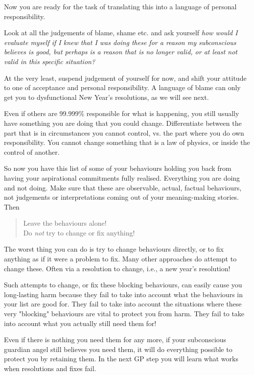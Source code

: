 Now you are ready for the task of translating this into a language of personal responsibility. 


Look at all the judgements of blame, shame etc. and ask yourself \emph{how would I evaluate myself if I knew that I was doing these for a reason my subconscious believes is good, but perhaps is a reason that is no longer valid, or at least not valid in this specific situation?}


At the very least, suspend judgement of yourself for now, and shift your attitude to one of acceptance and personal responsibility. A language of blame can only get you to dysfunctional New Year's resolutions, as we will see next.


Even if others are 99.999\% responsible for what is happening, you still usually have something you are doing that you could change. Differentiate between the part that is in circumstances you cannot control, vs. the part where you do own responsibility. You cannot change something that is a law of physics, or inside the control of another.


So now you have this list of some of your behaviours holding you back from having your aspirational commitments fully realised. Everything you are doing and not doing. Make sure that these are observable, actual, factual behaviours, not judgements or interpretations coming out of your meaning-making stories. Then


\begin{quote}
Leave the behaviours alone! \\
Do \emph{not} try to change or fix anything! 
\end{quote}


The worst thing you can do is try to change behaviours directly, or to fix anything as if it were a problem to fix. Many other approaches do attempt to change these. Often via a resolution to change, i.e., a new year's resolution! 


Such attempts to change, or fix these blocking behaviours, can easily cause you long-lasting harm because they fail to take into account what the behaviours in your list are good for. They fail to take into account the situations where these very "blocking" behaviours are vital to protect you from harm. They fail to take into account what you actually still need them for!


Even if there is nothing you need them for any more, if your subconscious guardian angel still believes you need them, it will do everything possible to protect you by retaining them. In the next GP step you will learn what works when resolutions and fixes fail.




